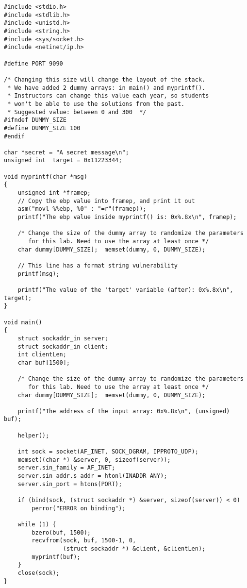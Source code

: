 \begin{lstlisting}[label=format:code:server, caption={The vulnerable server program
             \texttt{server.c} (can be downloaded from the lab's website)}]
#include <stdio.h>
#include <stdlib.h>
#include <unistd.h>
#include <string.h>
#include <sys/socket.h>
#include <netinet/ip.h>

#define PORT 9090

/* Changing this size will change the layout of the stack.
 * We have added 2 dummy arrays: in main() and myprintf().
 * Instructors can change this value each year, so students
 * won't be able to use the solutions from the past.
 * Suggested value: between 0 and 300  */
#ifndef DUMMY_SIZE
#define DUMMY_SIZE 100
#endif

char *secret = "A secret message\n";
unsigned int  target = 0x11223344;

void myprintf(char *msg)
{
    unsigned int *framep;
    // Copy the ebp value into framep, and print it out
    asm("movl %%ebp, %0" : "=r"(framep));
    printf("The ebp value inside myprintf() is: 0x%.8x\n", framep);

    /* Change the size of the dummy array to randomize the parameters
       for this lab. Need to use the array at least once */
    char dummy[DUMMY_SIZE];  memset(dummy, 0, DUMMY_SIZE);

    // This line has a format string vulnerability
    printf(msg);

    printf("The value of the 'target' variable (after): 0x%.8x\n", target);
}

void main()
{
    struct sockaddr_in server;
    struct sockaddr_in client;
    int clientLen;
    char buf[1500];

    /* Change the size of the dummy array to randomize the parameters
       for this lab. Need to use the array at least once */
    char dummy[DUMMY_SIZE];  memset(dummy, 0, DUMMY_SIZE);

    printf("The address of the input array: 0x%.8x\n", (unsigned) buf);

    helper();

    int sock = socket(AF_INET, SOCK_DGRAM, IPPROTO_UDP);
    memset((char *) &server, 0, sizeof(server));
    server.sin_family = AF_INET;
    server.sin_addr.s_addr = htonl(INADDR_ANY);
    server.sin_port = htons(PORT);

    if (bind(sock, (struct sockaddr *) &server, sizeof(server)) < 0)
        perror("ERROR on binding");

    while (1) {
        bzero(buf, 1500);
        recvfrom(sock, buf, 1500-1, 0,
                 (struct sockaddr *) &client, &clientLen);
        myprintf(buf);
    }
    close(sock);
}
\end{lstlisting}

